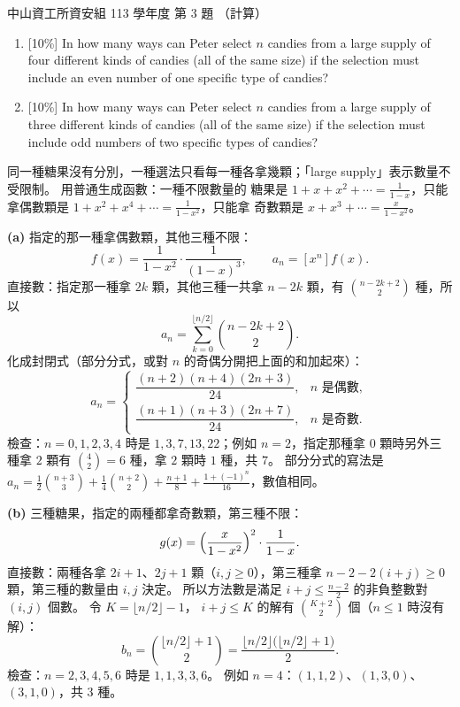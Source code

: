 \begin{pastexam}[label={px:nsysu-113-dmalg-03}]{中山資工所資安組 113 學年度 第 3 題}
（計算）

\begin{enumerate}[label=(\alph*)]
\item {[10\%]} In how many ways can Peter select $n$ candies from a large supply of four different kinds of
candies (all of the same size) if the selection must include an even number of one specific type of candies?
\item {[10\%]} In how many ways can Peter select $n$ candies from a large supply of three different kinds of
candies (all of the same size) if the selection must include odd numbers of two specific types of candies?
\end{enumerate}
\end{pastexam}

\begin{pastsoln}
同一種糖果沒有分別，一種選法只看每一種各拿幾顆；「large supply」表示數量不受限制。 用普通生成函數：一種不限數量的
糖果是 $1 + x + x^2 + \cdots = \frac{1}{1 - x}$，只能拿偶數顆是 $1 + x^2 + x^4 + \cdots = \frac{1}{1 - x^2}$，只能拿
奇數顆是 $x + x^3 + \cdots = \frac{x}{1 - x^2}$。

\textbf{(a)} 指定的那一種拿偶數顆，其他三種不限：
\[
f(x) = \frac{1}{1 - x^2} \cdot \frac{1}{(1 - x)^3} ,\qquad a_n = [x^n] f(x).
\]
直接數：指定那一種拿 $2k$ 顆，其他三種一共拿 $n - 2k$ 顆，有 $\binom{n - 2k + 2}{2}$ 種，所以
\[
a_n = \sum_{k=0}^{\lfloor n/2 \rfloor} \binom{n - 2k + 2}{2} .
\]
化成封閉式（部分分式，或對 $n$ 的奇偶分開把上面的和加起來）：
\[
a_n = \begin{cases}
\dfrac{(n+2)(n+4)(2n+3)}{24}, & n \text{ 是偶數},\\[2ex]
\dfrac{(n+1)(n+3)(2n+7)}{24}, & n \text{ 是奇數}.
\end{cases}
\]
檢查：$n = 0, 1, 2, 3, 4$ 時是 $1, 3, 7, 13, 22$；例如 $n = 2$，指定那種拿 $0$ 顆時另外三種拿 $2$ 顆有
$\binom{4}{2} = 6$ 種，拿 $2$ 顆時 $1$ 種，共 $7$。 部分分式的寫法是
$a_n = \frac{1}{2}\binom{n+3}{3} + \frac{1}{4}\binom{n+2}{2} + \frac{n+1}{8} + \frac{1 + (-1)^n}{16}$，數值相同。

\textbf{(b)} 三種糖果，指定的兩種都拿奇數顆，第三種不限：
\[
g(x) = \Bigl(\frac{x}{1 - x^2}\Bigr)^2 \cdot \frac{1}{1 - x} .
\]
直接數：兩種各拿 $2i + 1$、$2j + 1$ 顆（$i, j \ge 0$），第三種拿 $n - 2 - 2(i + j) \ge 0$ 顆，第三種的數量由 $i, j$
決定。 所以方法數是滿足 $i + j \le \frac{n-2}{2}$ 的非負整數對 $(i, j)$ 個數。 令 $K = \lfloor n/2 \rfloor - 1$，
$i + j \le K$ 的解有 $\binom{K + 2}{2}$ 個（$n \le 1$ 時沒有解）：
\[
b_n = \binom{\lfloor n/2 \rfloor + 1}{2} = \frac{\lfloor n/2 \rfloor \bigl(\lfloor n/2 \rfloor + 1\bigr)}{2} .
\]
檢查：$n = 2, 3, 4, 5, 6$ 時是 $1, 1, 3, 3, 6$。 例如 $n = 4$：$(1, 1, 2)$、$(1, 3, 0)$、$(3, 1, 0)$，共 $3$ 種。
\end{pastsoln}
